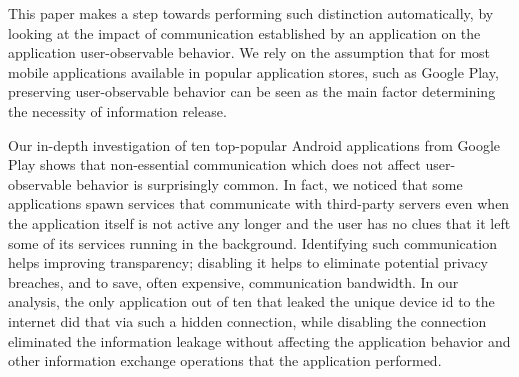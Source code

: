 
This paper makes a step towards performing such distinction automatically, 
by looking at the impact of communication established by an application on the application user-observable behavior. 
We rely on the assumption that for most mobile applications available in popular application stores, such as Google Play, 
preserving user-observable behavior can be seen as the main factor determining the necessity of information release. 

Our in-depth investigation of ten top-popular Android applications from Google Play shows that non-essential communication which does not affect user-observable behavior is surprisingly common.
In fact, we noticed that some applications spawn services that communicate with third-party servers even when the application itself is not active any longer and the user has no clues that it left some of its services running in the background. 
Identifying such communication helps improving transparency; disabling it helps to eliminate potential privacy breaches, and to save, often expensive, communication bandwidth. 
In our analysis, the only application out of ten that leaked the unique device id to the internet did that via such a hidden connection, while disabling the connection eliminated the information leakage without affecting the application behavior and other information exchange operations that the application performed.


